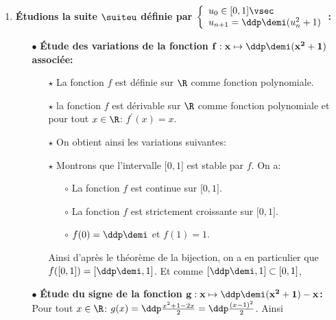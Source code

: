 
\begin{correction} \;
\begin{enumerate}
\item \textbf{\'Etudions la suite $\mathbf{\suiteu}$ d\'efinie par $\mathbf{\left\lbrace\begin{array}{l}
u_0\in\lbrack 0,1\rbrack\vsec\\
u_{n+1}=\ddp\demi(u_n^2+1)
\end{array}\right.}$:}
\begin{itemize}
\item[$\bullet$] \textbf{\'Etude des variations de la fonction $\mathbf{f: x\mapsto \ddp\demi(x^2+1)}$ associ\'ee:}
\begin{itemize}
\item[$\star$] La fonction $f$ est d\'efinie sur $\R$ comme fonction polynomiale.
\item[$\star$] la fonction $f$ est d\'erivable sur $\R$ comme fonction polynomiale et pour tout $x\in\R$: $f^{\prime}(x)=x$.
\item[$\star$] On obtient ainsi les variations suivantes:
\begin{center}
\end{center}
\item[$\star$] Montrons que l'intervalle $\lbrack 0,1\rbrack$ est stable par $f$. On a:
\begin{itemize}
\item[$\circ$] La fonction $f$ est continue sur $\lbrack 0,1\rbrack$.
\item[$\circ$] La fonction $f$ est strictement croissante sur $\lbrack 0,1\rbrack$.
\item[$\circ$] $f(0)=\ddp\demi$ et $f(1)=1$.
\end{itemize}
Ainsi d'apr\`{e}s le th\'eor\`{e}me de la bijection, on a en particulier que $f(\lbrack 0,1\rbrack)=\left\lbrack \ddp\demi,1\right\rbrack$. Et comme $\left\lbrack \ddp\demi,1\right\rbrack \subset \lbrack 0,1\rbrack$,  
\end{itemize}
\item[$\bullet$] \textbf{\'Etude du signe de la fonction $\mathbf{g: x\mapsto \ddp\demi(x^2+1)-x}$:}\\
\noindent Pour tout $x\in\R$: $g(x)=\ddp\frac{x^2+1-2x}{2}=\ddp\frac{(x-1)^2}{2}$. Ainsi


\end{itemize}
\end{enumerate}
\end{correction}
